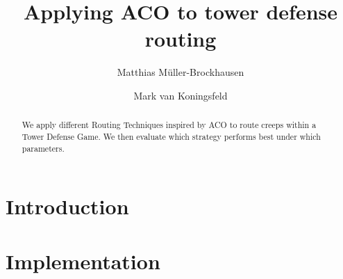 \documentclass[runningheads,a4paper]{llncs}
\begin{document}
\mainmatter  %

\title{Applying ACO to tower defense routing}


%
%
\author{Matthias Müller-Brockhausen \and Mark van Koningsfeld}
%


%
%

\maketitle


\begin{abstract}
We apply different Routing Techniques inspired by ACO to route creeps within a Tower Defense Game. We then evaluate which strategy performs best under which parameters.
\end{abstract}




\section{Introduction}
\label{sec:introduction}


\section{Implementation}
\label{sec:implementation}

\end{document}
